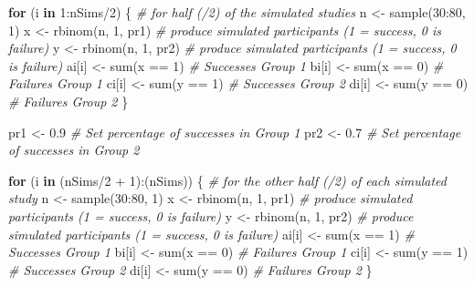 \documentclass[
  oneside]{krantz}
\makeatletter
\newenvironment{Shaded}{\begin{snugshade}}{\end{snugshade}}
\newcommand{\CommentTok}[1]{\textcolor[rgb]{0.37,0.37,0.37}{\textit{#1}}}
\newcommand{\ControlFlowTok}[1]{\textcolor[rgb]{0.27,0.27,0.27}{\textbf{#1}}}
\newcommand{\DecValTok}[1]{\textcolor[rgb]{0.06,0.06,0.06}{#1}}
\newcommand{\FloatTok}[1]{\textcolor[rgb]{0.06,0.06,0.06}{#1}}
\newcommand{\FunctionTok}[1]{\textcolor[rgb]{0,0,0}{#1}}
\newcommand{\NormalTok}[1]{#1}
\newcommand{\OtherTok}[1]{\textcolor[rgb]{0.37,0.37,0.37}{#1}}
\newcommand{\SpecialCharTok}[1]{\textcolor[rgb]{0,0,0}{#1}}
\newenvironment{kframe}{%
\medskip{}
\setlength{\fboxsep}{.8em}
 \def\at@end@of@kframe{}%
 \ifinner\ifhmode%
  \def\at@end@of@kframe{\end{minipage}}%
  \begin{minipage}{\columnwidth}%
 \fi\fi%
 \def\FrameCommand##1{\hskip\@totalleftmargin \hskip-\fboxsep
 \colorbox{shadecolor}{##1}\hskip-\fboxsep
     \hskip-\linewidth \hskip-\@totalleftmargin \hskip\columnwidth}%
 \MakeFramed {\advance\hsize-\width
   \@totalleftmargin\z@ \linewidth\hsize
   \@setminipage}}%
 {\par\unskip\endMakeFramed%
 \at@end@of@kframe}
\renewenvironment{Shaded}{\begin{kframe}}{\end{kframe}}
\makeatother
\begin{document}
\begin{Shaded}
\begin{Highlighting}[]
\ControlFlowTok{for}\NormalTok{ (i }\ControlFlowTok{in} \DecValTok{1}\SpecialCharTok{:}\NormalTok{nSims}\SpecialCharTok{/}\DecValTok{2}\NormalTok{) \{ }\CommentTok{\# for half (/2) of the simulated studies}
\NormalTok{  n }\OtherTok{\textless{}{-}} \FunctionTok{sample}\NormalTok{(}\DecValTok{30}\SpecialCharTok{:}\DecValTok{80}\NormalTok{, }\DecValTok{1}\NormalTok{)}
\NormalTok{  x }\OtherTok{\textless{}{-}} \FunctionTok{rbinom}\NormalTok{(n, }\DecValTok{1}\NormalTok{, pr1) }\CommentTok{\# produce simulated participants (1 = success, 0 is failure)}
\NormalTok{  y }\OtherTok{\textless{}{-}} \FunctionTok{rbinom}\NormalTok{(n, }\DecValTok{1}\NormalTok{, pr2) }\CommentTok{\# produce simulated participants (1 = success, 0 is failure)}
\NormalTok{  ai[i] }\OtherTok{\textless{}{-}} \FunctionTok{sum}\NormalTok{(x }\SpecialCharTok{==} \DecValTok{1}\NormalTok{) }\CommentTok{\# Successes Group 1}
\NormalTok{  bi[i] }\OtherTok{\textless{}{-}} \FunctionTok{sum}\NormalTok{(x }\SpecialCharTok{==} \DecValTok{0}\NormalTok{) }\CommentTok{\# Failures Group 1}
\NormalTok{  ci[i] }\OtherTok{\textless{}{-}} \FunctionTok{sum}\NormalTok{(y }\SpecialCharTok{==} \DecValTok{1}\NormalTok{) }\CommentTok{\# Successes Group 2}
\NormalTok{  di[i] }\OtherTok{\textless{}{-}} \FunctionTok{sum}\NormalTok{(y }\SpecialCharTok{==} \DecValTok{0}\NormalTok{) }\CommentTok{\# Failures Group 2}
\NormalTok{\}}

\NormalTok{pr1 }\OtherTok{\textless{}{-}} \FloatTok{0.9} \CommentTok{\# Set percentage of successes in Group 1}
\NormalTok{pr2 }\OtherTok{\textless{}{-}} \FloatTok{0.7} \CommentTok{\# Set percentage of successes in Group 2}

\ControlFlowTok{for}\NormalTok{ (i }\ControlFlowTok{in}\NormalTok{ (nSims}\SpecialCharTok{/}\DecValTok{2} \SpecialCharTok{+} \DecValTok{1}\NormalTok{)}\SpecialCharTok{:}\NormalTok{(nSims)) \{ }\CommentTok{\# for the other half (/2) of each simulated study}
\NormalTok{  n }\OtherTok{\textless{}{-}} \FunctionTok{sample}\NormalTok{(}\DecValTok{30}\SpecialCharTok{:}\DecValTok{80}\NormalTok{, }\DecValTok{1}\NormalTok{)}
\NormalTok{  x }\OtherTok{\textless{}{-}} \FunctionTok{rbinom}\NormalTok{(n, }\DecValTok{1}\NormalTok{, pr1) }\CommentTok{\# produce simulated participants (1 = success, 0 is failure)}
\NormalTok{  y }\OtherTok{\textless{}{-}} \FunctionTok{rbinom}\NormalTok{(n, }\DecValTok{1}\NormalTok{, pr2) }\CommentTok{\# produce simulated participants (1 = success, 0 is failure)}
\NormalTok{  ai[i] }\OtherTok{\textless{}{-}} \FunctionTok{sum}\NormalTok{(x }\SpecialCharTok{==} \DecValTok{1}\NormalTok{) }\CommentTok{\# Successes Group 1}
\NormalTok{  bi[i] }\OtherTok{\textless{}{-}} \FunctionTok{sum}\NormalTok{(x }\SpecialCharTok{==} \DecValTok{0}\NormalTok{) }\CommentTok{\# Failures Group 1}
\NormalTok{  ci[i] }\OtherTok{\textless{}{-}} \FunctionTok{sum}\NormalTok{(y }\SpecialCharTok{==} \DecValTok{1}\NormalTok{) }\CommentTok{\# Successes Group 2}
\NormalTok{  di[i] }\OtherTok{\textless{}{-}} \FunctionTok{sum}\NormalTok{(y }\SpecialCharTok{==} \DecValTok{0}\NormalTok{) }\CommentTok{\# Failures Group 2}
\NormalTok{\}}


\end{Highlighting}
\end{Shaded}
\end{document}
